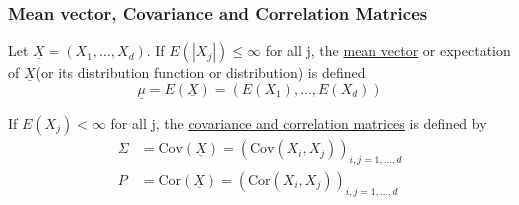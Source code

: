 \documentclass{article}
\newcommand{\Cov}{\mathrm{Cov}}
\newcommand{\Cor}{\text{Cor}}
\begin{document}
			\subsubsection{Mean vector, Covariance and Correlation Matrices}
			
			\begin{mydef}{}{}
				Let $\underline{X}=(X_1, \dots, X_d)$. If $E(|X_j|)\leq\infty$ for all j, the \ul{mean vector} or expectation of $\underline{X}$(or its distribution function or distribution) is defined $$\underline{\mu}=E(\underline{X})=(E(X_1), \dots, E(X_d))$$
				
				If $E(X_j)<\infty$ for all j, the \ul{covariance and correlation matrices} is defined by
				\begin{align*}
					\Sigma&=\Cov(\underline{X})=(\Cov(X_i, X_j))_{i, j=1, \dots, d}\\
					P&=\Cor(\underline{X})=(\Cor(X_i, X_j))_{i, j=1, \dots, d}
				\end{align*}
			\end{mydef}
			
\end{document}
